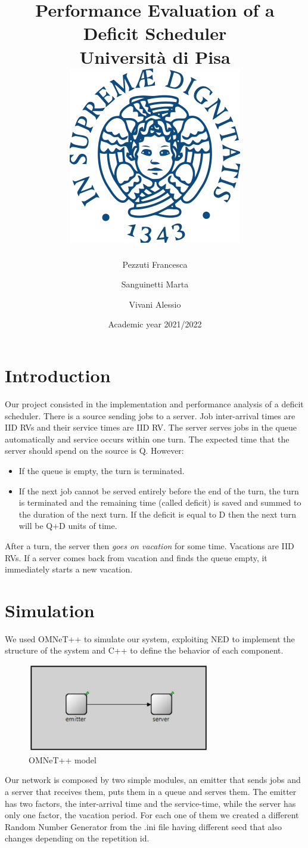 \documentclass{article}
\title{
	{Performance Evaluation of a Deficit Scheduler}\\
	{\large Università di Pisa\vspace{1cm}}\\
	{\includegraphics[scale=.5]{images/Stemma_unipi.png}}
}
\author{Pezzuti Francesca \and Sanguinetti Marta \and Vivani Alessio}
\date{Academic year 2021/2022}
\begin{document}
\maketitle

\newpage

\tableofcontents

\newpage

\section{Introduction}
    Our project consisted in the implementation and performance analysis of a deficit scheduler. There is a source sending jobs to a server. Job inter-arrival times are IID RVs and their service times are IID RV. The server serves jobs in the queue automatically and service occurs within one turn. The expected time that the server should spend on the source is Q. However:
    \begin{itemize}
        \item If the queue is empty, the turn is terminated.
        \item If the next job cannot be served entirely before the end of the turn, the turn is terminated and the remaining time (called deficit) is saved and summed to the duration of the next turn. If the deficit is equal to D then the next turn will be Q+D units of time.
    \end{itemize}
    After a turn, the server then \textit{goes on vacation} for some time. Vacations are IID RVs. If a server comes back from vacation and finds the queue empty, it immediately starts a new vacation.

\newpage

\section{Simulation}
    We used OMNeT++ to simulate our system, exploiting NED to implement the structure of the system and C++ to define the behavior of each component.
    \newline
    \begin{figure}[ht!]
        \centering
        \includegraphics[width=80mm]{images/Network.JPG}
        \caption{OMNeT++ model}
        \label{fig:Omnet_model}
    \end{figure}
    \newline
    Our network is composed by two simple modules, an emitter that sends jobs and a server that receives them, puts them in a queue and serves them. The emitter has two factors, the inter-arrival time and the service-time, while the server has only one factor, the vacation period. For each one of them we created a different Random Number Generator from the .ini file having different seed that also changes depending on the repetition id.
    
\end{document}
